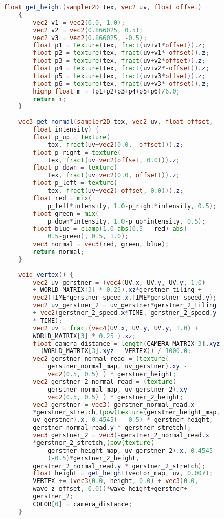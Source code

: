 \begin{lstlisting}[language=GLSL, caption={\label{cf:agua} \textit{Shader} de efeito de água na Unity}]
	float get_height(sampler2D tex, vec2 uv, float offset) 
	{
		vec2 v1 = vec2(0.0, 1.0);
		vec2 v2 = vec2(0.866025, 0.5);
		vec2 v3 = vec2(0.866025, -0.5);
		float p1 = texture(tex, fract(uv+v1*offset)).z;
		float p2 = texture(tex, fract(uv+v1*-offset)).z;
		float p3 = texture(tex, fract(uv+v2*offset)).z;
		float p4 = texture(tex, fract(uv+v2*-offset)).z;
		float p5 = texture(tex, fract(uv+v3*offset)).z;
		float p6 = texture(tex, fract(uv+v3*-offset)).z;
		highp float m = (p1+p2+p3+p4+p5+p6)/6.0;
		return m;
	}
	
	vec3 get_normal(sampler2D tex, vec2 uv, float offset, 
		float intensity) {
		float p_up = texture(
			tex, fract(uv+vec2(0.0, -offset))).z;
		float p_right = texture(
			tex, fract(uv+vec2(offset, 0.0))).z;
		float p_down = texture(
			tex, fract(uv+vec2(0.0, offset))).z;
		float p_left = texture(
			tex, fract(uv+vec2(-offset, 0.0))).z;
		float red = mix(
			p_left*intensity, 1.0-p_right*intensity, 0.5);
		float green = mix(
			p_down*intensity, 1.0-p_up*intensity, 0.5);
		float blue = clamp(1.0-abs(0.5 - red)-abs(
			0.5-green), 0.5, 1.0);
		vec3 normal = vec3(red, green, blue);
		return normal;
	}
	
	void vertex() {
		vec2 uv_gerstner = (vec4(UV.x, UV.y, UV.y, 1.0)
		+ WORLD_MATRIX[3] * 0.25).xz*gerstner_tiling + 
		vec2(TIME*gerstner_speed.x,TIME*gerstner_speed.y);
		vec2 uv_gerstner_2 = uv_gerstner*gerstner_2_tiling 
		+ vec2(gerstner_2_speed.x*TIME, gerstner_2_speed.y 
		* TIME);
		vec2 uv = fract(vec4(UV.x, UV.y, UV.y, 1.0) + 
		WORLD_MATRIX[3] * 0.25 ).xz;
		float camera_distance = length(CAMERA_MATRIX[3].xyz 
		- (WORLD_MATRIX[3].xyz - VERTEX)) / 1000.0;
		vec2 gerstner_normal_read = (texture(
			gerstner_normal_map, uv_gerstner).xy - 
			vec2(0.5, 0.5) ) * gerstner_height;
		vec2 gerstner_2_normal_read = (texture(
			gerstner_normal_map, uv_gerstner_2).xy - 
			vec2(0.5, 0.5) ) * gerstner_2_height;
		vec3 gerstner = vec3(-gerstner_normal_read.x 
		*gerstner_stretch,(pow(texture(gerstner_height_map, 
		uv_gerstner).x, 0.4545) - 0.5) * gerstner_height, 
		gerstner_normal_read.y * gerstner_stretch);
		vec3 gerstner_2 = vec3(-gerstner_2_normal_read.x 
		*gerstner_2_stretch,(pow(texture(
			gerstner_height_map, uv_gerstner_2).x, 0.4545
			)-0.5)*gerstner_2_height, 
		gerstner_2_normal_read.y * gerstner_2_stretch);
		float height = get_height(vector_map, uv, 0.007);
		VERTEX += (vec3(0.0, height, 0.0) + vec3(0.0, 
		wave_z_offset, 0.0))*wave_height+gerstner+ 
		gerstner_2;
		COLOR[0] = camera_distance;
	}
	

\end{lstlisting}
